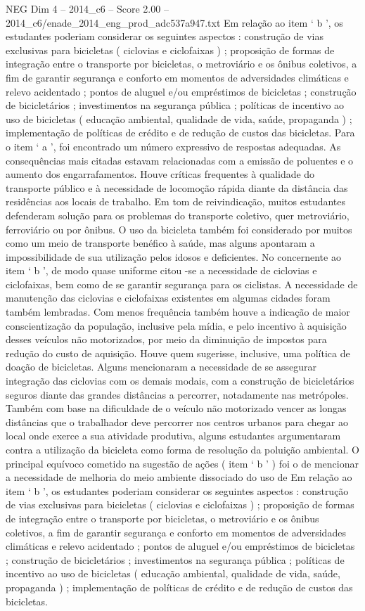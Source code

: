 \begin{textsample}{NEG Dim 4 – 2014\_c6 – Score 2.00 – 2014\_c6/enade\_2014\_eng\_prod\_adc537a947.txt}
Em relação ao item ‘ b ’, os estudantes poderiam considerar os seguintes aspectos : construção de vias exclusivas para bicicletas ( ciclovias e ciclofaixas ) ; proposição de formas de integração entre o transporte por bicicletas, o metroviário e os ônibus coletivos, a fim de garantir segurança e conforto em momentos de adversidades climáticas e relevo acidentado ; pontos de aluguel e/ou empréstimos de bicicletas ; construção de bicicletários ; investimentos na segurança pública ; políticas de incentivo ao uso de bicicletas ( educação ambiental, qualidade de vida, saúde, propaganda ) ; implementação de políticas de crédito e de redução de custos das bicicletas.
Para o item ‘ a ’, foi encontrado um número expressivo de respostas adequadas.
As consequências mais citadas estavam relacionadas com a emissão de poluentes e o aumento dos engarrafamentos.
Houve críticas frequentes à qualidade do transporte público e à necessidade de locomoção rápida diante da distância das residências aos locais de trabalho.
Em tom de reivindicação, muitos estudantes defenderam solução para os problemas do transporte coletivo, quer metroviário, ferroviário ou por ônibus.
O uso da bicicleta também foi considerado por muitos como um meio de transporte benéfico à saúde, mas alguns apontaram a impossibilidade de sua utilização pelos idosos e deficientes.
No concernente ao item ‘ b ’, de modo quase uniforme citou -se a necessidade de ciclovias e ciclofaixas, bem como de se garantir segurança para os ciclistas.
A necessidade de manutenção das ciclovias e ciclofaixas existentes em algumas cidades foram também lembradas.
Com menos frequência também houve a indicação de maior conscientização da população, inclusive pela mídia, e pelo incentivo à aquisição desses veículos não motorizados, por meio da diminuição de impostos para redução do custo de aquisição.
Houve quem sugerisse, inclusive, uma política de doação de bicicletas.
Alguns mencionaram a necessidade de se assegurar integração das ciclovias com os demais modais, com a construção de bicicletários seguros diante das grandes distâncias a percorrer, notadamente nas metrópoles.
Também com base na dificuldade de o veículo não motorizado vencer as longas distâncias que o trabalhador deve percorrer nos centros urbanos para chegar ao local onde exerce a sua atividade produtiva, alguns estudantes argumentaram contra a utilização da bicicleta como forma de resolução da poluição ambiental.
O principal equívoco cometido na sugestão de ações ( item ‘ b ’ ) foi o de mencionar a necessidade de melhoria do meio ambiente dissociado do uso de Em relação ao item ‘ b ’, os estudantes poderiam considerar os seguintes aspectos : construção de vias exclusivas para bicicletas ( ciclovias e ciclofaixas ) ; proposição de formas de integração entre o transporte por bicicletas, o metroviário e os ônibus coletivos, a fim de garantir segurança e conforto em momentos de adversidades climáticas e relevo acidentado ; pontos de aluguel e/ou empréstimos de bicicletas ; construção de bicicletários ; investimentos na segurança pública ; políticas de incentivo ao uso de bicicletas ( educação ambiental, qualidade de vida, saúde, propaganda ) ; implementação de políticas de crédito e de redução de custos das bicicletas.

\end{textsample}
